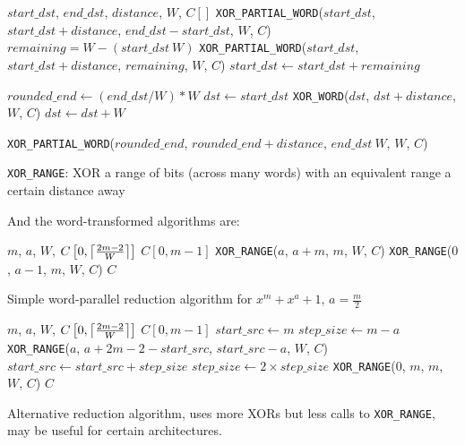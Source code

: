 \begin{algorithm}
\begin{algorithmic}[1]
  \REQUIRE $start\_dst$, $end\_dst$, $distance$, $W$, $C[]$
    \STATE \texttt{XOR\_PARTIAL\_WORD}($start\_dst$, $start\_dst + distance$, $end\_dst - start\_dst$, $W$, $C$)
  \ELSE
      \STATE $remaining = W - (start\_dst \ W)$
      \STATE \texttt{XOR\_PARTIAL\_WORD}($start\_dst$, $start\_dst + distance$, $remaining$, $W$, $C$)
      \STATE $start\_dst \gets start\_dst + remaining$
    \ENDIF
    
    \STATE $rounded\_end \gets (end\_dst / W) * W$
    \STATE $dst \gets start\_dst$
      \STATE \texttt{XOR\_WORD}($dst$, $dst + distance$, $W$, $C$)
      \STATE $dst \gets dst + W$
    \ENDWHILE
    
      \STATE \texttt{XOR\_PARTIAL\_WORD}($rounded\_end$, $rounded\_end + distance$, $end\_dst \ W$, $W$, $C$)
    \ENDIF
  \ENDIF
  \caption{\texttt{XOR\_RANGE}: XOR a range of bits (across many words) with an equivalent range a certain distance away}
\end{algorithmic}
\end{algorithm}


And the word-transformed algorithms are:

\begin{algorithm}
\begin{algorithmic}[1]
  \REQUIRE $m$, $a$, $W$, $C\left[0,\ceil*{\frac{2m-2}{W}}\right]$
  \ENSURE $C[0,m-1]$
  \STATE \texttt{XOR\_RANGE}($a$, $a+m$, $m$, $W$, $C$)
  \STATE \texttt{XOR\_RANGE}($0$, $a-1$, $m$, $W$, $C$)
  \RETURN $C$
  \caption{Simple word-parallel reduction algorithm for $x^m + x^a +1$, $a = \frac{m}{2}$}
  \label{alg:equallyspaced:word:operation}
\end{algorithmic}
\end{algorithm}

\begin{algorithm}
\begin{algorithmic}[1]
  \REQUIRE $m$, $a$, $W$, $C\left[0,\ceil*{\frac{2m-2}{W}}\right]$
  \ENSURE $C[0,m-1]$
  \STATE $start\_src \gets m$
  \STATE $step\_size \gets m - a$
    \STATE \texttt{XOR\_RANGE}($a$, $a + 2m-2 - start\_src$, $start\_src - a$, $W$, $C$)
    \STATE $start\_src \gets start\_src + step\_size$
    \STATE $step\_size \gets 2 \times step\_size$
  \ENDWHILE
  \STATE \texttt{XOR\_RANGE}($0$, $m$, $m$, $W$, $C$)
  \RETURN $C$
  \caption{Alternative reduction algorithm, uses more XORs but less calls to \texttt{XOR\_RANGE}, may be useful for certain architectures.}
  \label{alg:new:word:operation}
\end{algorithmic}
\end{algorithm}


